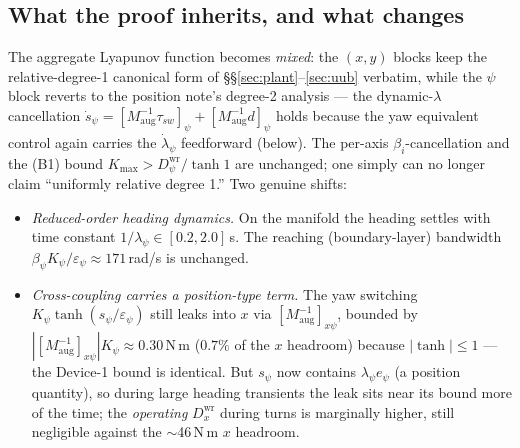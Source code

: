 \documentclass[11pt]{article}
\theoremstyle{plain}
\theoremstyle{definition}
\newcommand{\Maug}{M_{\mathrm{aug}}}
\newcommand{\Dwr}{D^{\mathrm{wr}}}
\newcommand{\Kmax}{K_{\max}}
\begin{document}
\subsection{What the proof inherits, and what changes}
The aggregate Lyapunov function becomes \emph{mixed}: the $(x,y)$ blocks keep the
relative-degree-1 canonical form of \S\S\ref{sec:plant}--\ref{sec:uub} verbatim, while
the $\psi$ block reverts to the position note's degree-2 analysis --- the dynamic-$\lambda$
cancellation $\dot s_\psi=[\Maug^{-1}\tau_{sw}]_\psi+[\Maug^{-1}d]_\psi$ holds because
the yaw equivalent control again carries the $\dot\lambda_\psi$ feedforward (below). The
per-axis $\beta_i$-cancellation and the (B1) bound $\Kmax>\Dwr_\psi/\tanh1$ are
unchanged; one simply can no longer claim ``uniformly relative degree 1.'' Two genuine
shifts:
\begin{itemize}[leftmargin=1.5em]
\item \emph{Reduced-order heading dynamics.} On the manifold the heading settles with
time constant $1/\lambda_\psi\in[0.2,2.0]\,$s. The reaching (boundary-layer) bandwidth
$\beta_\psi K_\psi/\varepsilon_\psi\approx171\,$rad/s is unchanged.
\item \emph{Cross-coupling carries a position-type term.} The yaw switching
$K_\psi\tanh(s_\psi/\varepsilon_\psi)$ still leaks into $x$ via $[\Maug^{-1}]_{x\psi}$,
bounded by $|[\Maug^{-1}]_{x\psi}|K_\psi\approx0.30\,$N\,m ($0.7\%$ of the $x$ headroom)
because $|\tanh|\le1$ --- the Device-1 bound is identical. But $s_\psi$ now contains
$\lambda_\psi e_\psi$ (a position quantity), so during large heading transients the
leak sits near its bound more of the time; the \emph{operating} $\Dwr_x$ during turns is
marginally higher, still negligible against the $\sim$46\,N\,m $x$ headroom.
\end{itemize}
\end{document}

